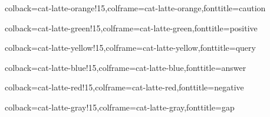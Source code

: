 \usepackage[utf8]{inputenc}
\usepackage[T1]{fontenc}
\usepackage[displaymath, mathlines,running]{lineno}
\usepackage{graphicx}
\usepackage{longtable}

\usepackage{amsmath}
\usepackage{amssymb}
\usepackage{amsthm}

\usepackage{hyperref}

\usepackage[normalem]{ulem}

\usepackage[dvipsnames]{xcolor}


\usepackage{tcolorbox}

%
{colback=cat-latte-orange!15,colframe=cat-latte-orange,fonttitle=\bfseries}{caution}

%
{colback=cat-latte-green!15,colframe=cat-latte-green,fonttitle=\bfseries}{positive}

%
{colback=cat-latte-yellow!15,colframe=cat-latte-yellow,fonttitle=\bfseries}{query}

%
{colback=cat-latte-blue!15,colframe=cat-latte-blue,fonttitle=\bfseries}{answer}

%
{colback=cat-latte-red!15,colframe=cat-latte-red,fonttitle=\bfseries}{negative}

%
{colback=cat-latte-gray!15,colframe=cat-latte-gray,fonttitle=\bfseries}{gap}
